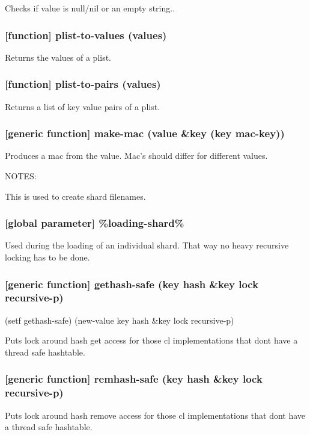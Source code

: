 \documentclass[11pt]{article}
\begin{document}
Checks if value is null/nil or an empty string..

\subsubsection{[function] plist-to-values (values)}
\label{sec:org63c9e91}

Returns the values of a plist.

\subsubsection{[function] plist-to-pairs (values)}
\label{sec:org3fe0559}

Returns a list of key value pairs of a plist.

\subsubsection{[generic function] make-mac (value \&key (key \textbf{mac-key}))}
\label{sec:orgbebc385}

Produces a mac from the value. Mac's should differ for different values.

NOTES:

This is used to create shard filenames.

\subsubsection{[global parameter] \%loading-shard\%}
\label{sec:orgba6f18c}

Used during the loading of an individual shard. That way no heavy
recursive locking has to be done.

\subsubsection{[generic function] gethash-safe (key hash \&key lock recursive-p)}
\label{sec:org2806953}
(setf gethash-safe) (new-value key hash \&key lock recursive-p)

Puts lock around hash get access for those cl implementations that
dont have a thread safe hashtable.

\subsubsection{[generic function] remhash-safe (key hash \&key lock recursive-p)}
\label{sec:org4c807f7}

Puts lock around hash remove access for those cl implementations that
dont have a thread safe hashtable.
\end{document}

